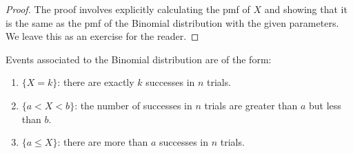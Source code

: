 \begin{proof}
The proof involves explicitly calculating the pmf of $X$ and showing that it is the same as the pmf of the Binomial distribution with the given parameters. We leave this as an exercise for the reader. 
\end{proof}


Events associated to the Binomial distribution are of the form:
\begin{enumerate}
    \item $\{X = k \}$: there are exactly $k$ successes in $n$ trials. 
    \item $\{a < X < b\}$: the number of successes in $n$ trials are greater  than $a$ but less than $b$.
    \item $\{a \le X\}$: there are more than $a$ successes in $n$ trials.
\end{enumerate}



